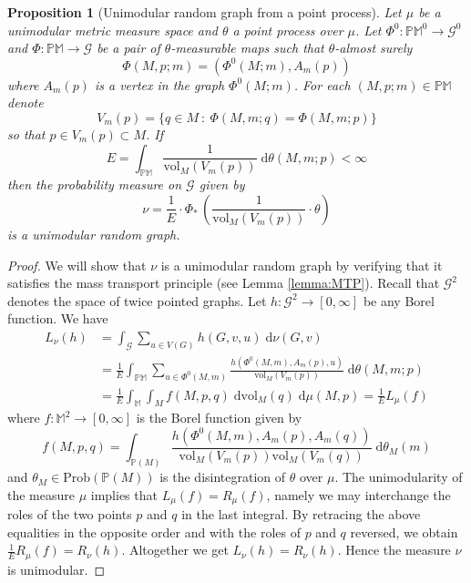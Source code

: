 \documentclass{amsart}
\newcommand{\MM}{\mathbb{M}}
\newcommand{\MP}{\mathbb{PM}}
\newcommand{\Points}{\mathbb{P}}
\newcommand{\Graphs}{\mathcal{G}}
\newcommand{\vol}{\mathrm{vol}}
\theoremstyle{plain}
\newtheorem{prop}[theorem]{Proposition}
\numberwithin{equation}{section}
\theoremstyle{definition}
\begin{document}
\begin{prop}[Unimodular random graph from a point process]
\label{prop:pushing forward unimodular - general}
Let $\mu$ be a unimodular metric measure space and 
$\theta$ a point process over $\mu$. Let $\Phi^0 : \MP^0 \to \Graphs^0$ and $\Phi : \MP \to \Graphs$ be a pair of $\theta$-measurable maps such that  $\theta$-almost surely  
$$
\Phi(M,p;m) = (\Phi^0(M;m), A_m(p)) $$
where $A_m(p)$ is a vertex in the graph $\Phi^0(M;m)$.  For each $(M,p;m) \in \MP$ denote 
$$ V_m(p) = \{q \in M \: : \: \Phi(M,m;q) = \Phi(M,m;p) \}$$
so that $p \in V_m(p) \subset M$.
If
\begin{equation}
\label{eq:convergence cond}
E = \int_{\MP} \frac{1}{\vol_M(V_m(p))} \; \mathrm{d}\theta (M,m;p) < \infty
\end{equation}
then the probability measure on $\Graphs$ given by
\begin{equation}
\nu = \frac{1}{E} \cdot \Phi_* \, \left( \frac{1}{\vol_M(V_m(p))} \cdot \theta \right)
\end{equation} 
is a unimodular random graph. 
\end{prop}
\begin{proof}
We will show that $\nu$ is a unimodular random graph by verifying that it satisfies the mass transport principle (see Lemma \ref{lemma:MTP}).
Recall that $\Graphs^2$ denotes the space of twice pointed graphs. Let $h : \Graphs^2 \to \left[0,\infty\right]$ be any Borel function.  We have
\begin{align*}
L_\nu(h) &= \int_{\Graphs} \sum_{u \in V(G)} h(G,v,u) 
\; \mathrm{d}\nu(G,v) \\  
& = \frac{1}{E} \int_{\MP} \sum_{u \in \Phi^0(M,m)} \frac{h(\Phi^0(M,m),A_m(p),u)}{\vol_M(V_m(p))}
\; \mathrm{d}\theta(M,m;p) \\
&=\frac {1}{E} \int_\MM  \int_M f(M,p,q) \; \mathrm{d vol}_M(q)\; \mathrm{d}\mu(M,p) = \frac {1}{E} L_\mu(f)
\end{align*}
 where $f : \MM^2 \to \left[0,\infty\right]$ is the Borel function
 given by $$f(M,p,q) = \int_{\Points(M)}  \frac{h(\Phi^0(M,m),A_m(p),A_m(q))}{\mathrm{vol}_M(V_m(p)) \mathrm{vol}_M(V_m(q))}   \; \mathrm{d}\theta_M(m)$$
 and $\theta_M \in \mathrm{Prob}(\Points(M))$ is the disintegration of $\theta$ over $\mu$. The unimodularity of the measure $\mu$ implies that $L_\mu(f) = R_\mu(f)$, namely we may interchange the roles of the two points $p$ and $q$ in the last integral. By retracing the above equalities in the opposite order and with the roles of $p$ and $q$ reversed, we obtain $\frac {1} {E} R_{\mu}(f) = R_\nu(h)$. Altogether we get $L_\nu(h) = R_\nu(h)$. Hence the measure $\nu$ is unimodular.
\end{proof}
\end{document}
